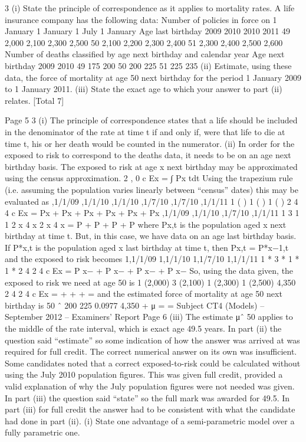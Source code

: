 3 (i) State the principle of correspondence as it applies to mortality rates. 
A life insurance company has the following data:
  Number of policies in force on
1 January 1 January 1 July 1 January
Age last birthday 2009 2010 2010 2011
49 2,000 2,100 2,300 2,500
50 2,100 2,200 2,300 2,400
51 2,300 2,400 2,500 2,600
Number of deaths classified by age next birthday and calendar year
Age next birthday 2009 2010
49 175 200
50 200 225
51 225 235
(ii) Estimate, using these data, the force of mortality at age 50 next birthday for
the period 1 January 2009 to 1 January 2011. 
(iii) State the exact age to which your answer to part (ii) relates. 
[Total 7]

Page 5
3
(i) The principle of correspondence states that a life should be included in the
denominator of the rate at time t if and only if, were that life to die at time t, his or her
death would be counted in the numerator.
(ii) In order for the exposed to risk to correspond to the deaths data, it needs to be on an
age next birthday basis.
The exposed to risk at age x next birthday may be approximated using the census
approximation.
2
,
0
c
Ex = ∫ Px tdt
Using the trapezium rule (i.e. assuming the population varies linearly between
                          “census” dates) this may be evaluated as
,1/1/09 ,1/1/10 ,1/1/10 ,1/7/10 ,1/7/10 ,1/1/11
1 ( ) 1 ( ) 1 ( )
2 4 4
c
Ex = Px + Px + Px + Px + Px + Px
,1/1/09 ,1/1/10 ,1/7/10 ,1/1/11
1 3 1 1
2 x 4 x 2 x 4 x = P + P + P + P
where Px,t is the population aged x next birthday at time t.
But, in this case, we have data on an age last birthday basis.
If P*x,t is the population aged x last birthday at time t, then
Px,t = P*x−1,t
and the exposed to risk becomes
1,1/1/09 1,1/1/10 1,1/7/10 1,1/1/11
1 * 3 * 1 * 1 *
  2 4 2 4
c
Ex = P x− + P x− + P x− + P x−
So, using the data given, the exposed to risk we need at age 50 is
1 (2,000) 3 (2,100) 1 (2,300) 1 (2,500) 4,350
2 4 2 4
c
Ex = + + + =
  and the estimated force of mortality at age 50 next birthday is
50
ˆ 200 225 0.0977
4,350
+
  μ = =
  Subject CT4 (Models) – September 2012 – Examiners’ Report
Page 6
(iii) The estimate μˆ 50 applies to the middle of the rate interval,
which is exact age 49.5 years.
In part (ii) the question said “estimate” so some indication of how the answer was arrived at
was required for full credit. The correct numerical answer on its own was insufficient. Some
candidates noted that a correct exposed-to-risk could be calculated without using the July
2010 population figures. This was given full credit, provided a valid explanation of why the
July population figures were not needed was given. In part (iii) the question said “state” so
the full mark was awarded for 49.5. In part (iii) for full credit the answer had to be
consistent with what the candidate had done in part (ii).
 (i) State one advantage of a semi-parametric model over a fully parametric one.

